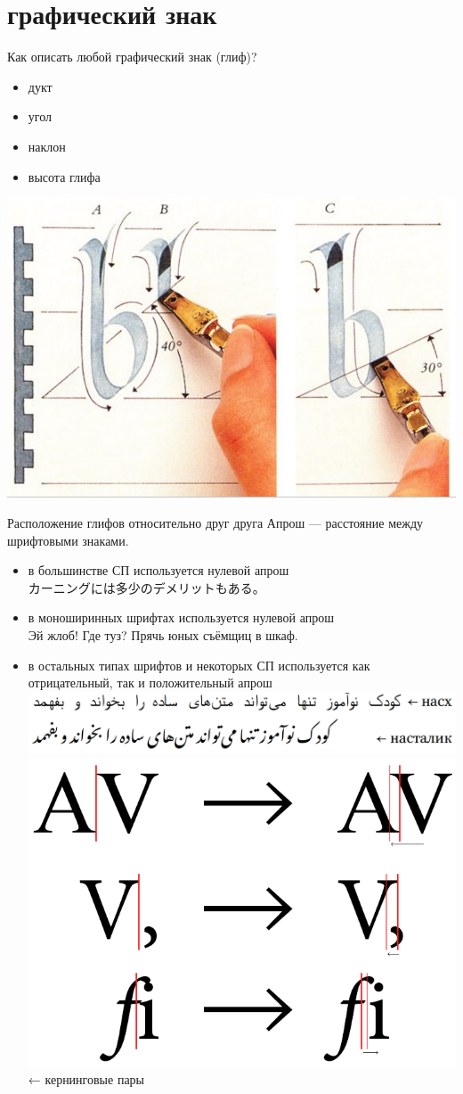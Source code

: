 \section{графический знак}
\begin{frame}{Как описать любой графический знак (глиф)?}
\begin{itemize}
\item дукт
\item угол
\item наклон
\item высота глифа
\end{itemize}
\hfil \includegraphics[width=0.75\linewidth]{gliph.png}
\end{frame}
\begin{frame}{Расположение глифов относительно друг друга}
Апрош — расстояние между шрифтовыми знаками.
\begin{itemize}
\item в большинстве СП используется нулевой апрош\\
{\JAP カーニングには多少のデメリットもある。}
\item в моноширинных шрифтах используется нулевой апрош\\
{\small \MON Эй жлоб! Где туз? Прячь юных съёмщиц в шкаф.}
\item в остальных типах шрифтов и некоторых СП используется как отрицательный, так и положительный апрош\\
\includegraphics[width=\linewidth]{arabic.png}
\includegraphics[width=0.4\linewidth]{approche.png}
\hfill ← кернинговые пары
\end{itemize}
\end{frame}
